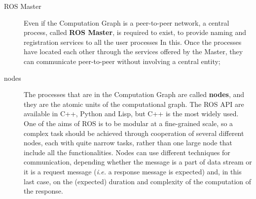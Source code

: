 \begin{description}
\item[ROS Master] Even if the Computation Graph is a peer-to-peer network, a central process, called  \textbf{\ac{ROS} Master}, is required to exist, to provide naming and registration services to all the user processes In this. Once the processes have located each other through the services offered by the Master, they can communicate peer-to-peer without involving a central entity;

\item[nodes] The processes that are in the Computation Graph are called \textbf{nodes}, and they are the atomic units of the computational graph. The \ac{ROS} API are available in C++, Python and Lisp, but C++ is the most widely used. One of the aims of \ac{ROS} is to be modular at a fine-grained scale, so a complex task should be achieved through cooperation of several different nodes, each with quite narrow tasks, rather than one large node that include all the functionalities. Nodes can use different techniques for communication, depending whether the message is a part of data stream or it is a request message (\textit{i.e.} a response message is expected) and, in this last case, on the (expected) duration and complexity of the computation of the response.


\begin{figure}
	\centering
	\qquad
		

\end{figure}
\end{description}
